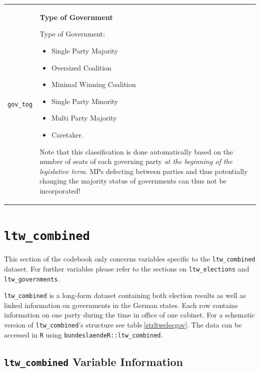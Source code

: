 \documentclass[
]{scrartcl}
\begin{document}
\begin{longtable}{p{3.2cm}| p{11cm}}
\texttt{gov\_tog} &\textbf{Type of Government}\newline 
\begin{flushleft}\vspace{-0.8cm}Type of Government:\setlist{nolistsep}\begin{itemize}[noitemsep]\item Single Party Majority \item Oversized Coalition \item Minimal Winning Coalition \item Single Party Minority \item Multi Party Majority \item Caretaker. \end{itemize}Note that this classification is done automatically based on the number of seats of each governing party \emph{at the beginning of the legislative term}. MPs defecting between parties and thus potentially changing the majority status of governments can thus not be incorporated!
\end{flushleft}
\end{longtable}

\newpage

\hypertarget{ltw_combined}{%
\section{\texorpdfstring{\texttt{ltw\_combined}}{ltw\_combined}}\label{ltw_combined}}

This section of the codebook only concerns variables specific to the
\texttt{ltw\_combined} dataset. For further variables please refer to
the sections on \texttt{ltw\_elections} and \texttt{ltw\_governments}.

\texttt{ltw\_combined} is a long-form dataset containing both election
results as well as linked information on governments in the German
states. Each row contains information on one party during the time in
office of one cabinet. For a schematic version of
\texttt{ltw\_combined}'s structure see table\(~\)\ref{strltwelecgov}.
The data can be accessed in \texttt{R} using
\texttt{bundeslaendeR::ltw\_combined}.

\hypertarget{ltw_combined-variable-information}{%
\subsection{\texorpdfstring{\texttt{ltw\_combined} Variable
Information}{ltw\_combined Variable Information}}\label{ltw_combined-variable-information}}
\end{document}
